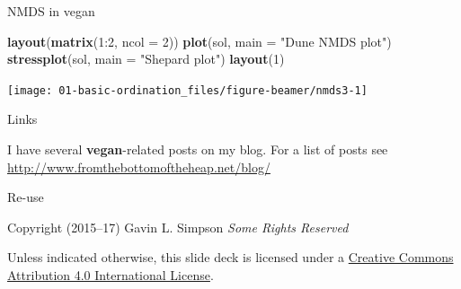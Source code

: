 \documentclass[10pt,ignorenonframetext,compress, aspectratio=169]{beamer}
\newenvironment{Shaded}{\begin{snugshade}}{\end{snugshade}}
\newcommand{\KeywordTok}[1]{\textcolor[rgb]{0.13,0.29,0.53}{\textbf{{#1}}}}
\newcommand{\DataTypeTok}[1]{\textcolor[rgb]{0.13,0.29,0.53}{{#1}}}
\newcommand{\DecValTok}[1]{\textcolor[rgb]{0.00,0.00,0.81}{{#1}}}
\newcommand{\StringTok}[1]{\textcolor[rgb]{0.31,0.60,0.02}{{#1}}}
\newcommand{\NormalTok}[1]{{#1}}
\begin{document}
\begin{frame}[fragile]{NMDS in vegan}

\begin{Shaded}
\begin{Highlighting}[]
\KeywordTok{layout}\NormalTok{(}\KeywordTok{matrix}\NormalTok{(}\DecValTok{1}\NormalTok{:}\DecValTok{2}\NormalTok{, }\DataTypeTok{ncol =} \DecValTok{2}\NormalTok{))}
\KeywordTok{plot}\NormalTok{(sol, }\DataTypeTok{main =} \StringTok{"Dune NMDS plot"}\NormalTok{)}
\KeywordTok{stressplot}\NormalTok{(sol, }\DataTypeTok{main =} \StringTok{"Shepard plot"}\NormalTok{)}
\KeywordTok{layout}\NormalTok{(}\DecValTok{1}\NormalTok{)}
\end{Highlighting}
\end{Shaded}

\begin{center}\texttt{[image: 01-basic-ordination\_files/figure-beamer/nmds3-1]} \end{center}

\end{frame}

\begin{frame}{Links}

I have several \textbf{vegan}-related posts on my blog. For a list of
posts see \href{}{http://www.fromthebottomoftheheap.net/blog/}

\end{frame}

\begin{frame}{Re-use}

Copyright \textcopyright (2015--17) Gavin L. Simpson \emph{Some Rights
Reserved}

Unless indicated otherwise, this slide deck is licensed under a
\href{http://creativecommons.org/licenses/by/4.0/}{Creative Commons
Attribution 4.0 International License}.

\begin{center}
  \ccby
\end{center}

\end{frame}
\end{document}
